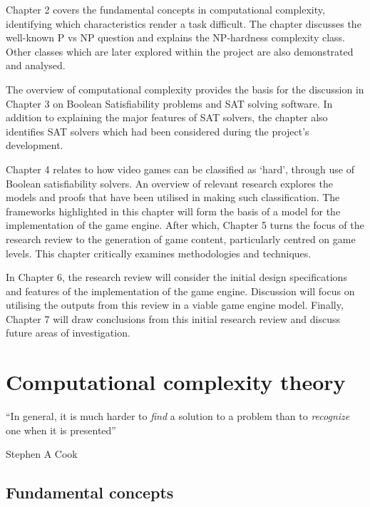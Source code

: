 \documentclass[11pt, a4paper, oneside]{report} %
\begin{document}
Chapter 2 covers the fundamental concepts in computational complexity,
identifying which characteristics render a task difficult. The chapter discusses
the well-known P vs NP question and explains the NP-hardness complexity class.
Other classes which are later explored within the project are also demonstrated
and analysed. 

The overview of computational complexity provides the basis for the discussion
in Chapter 3 on Boolean Satisfiability problems and SAT solving software. In
addition to explaining the major features of SAT solvers, the chapter also
identifies SAT solvers which had been considered during the project's
development.

Chapter 4 relates to how video games can be classified as `hard', through use of
Boolean satisfiability solvers. An overview of relevant research explores the
models and proofs that have been utilised in making such classification. The
frameworks highlighted in this chapter will form the basis of a model for the
implementation of the game engine. After which, Chapter 5 turns the focus of the
research review to the generation of game content, particularly centred on game
levels.  This chapter critically examines methodologies and techniques.

In Chapter 6, the research review will consider the initial design
specifications and features of the implementation of the game engine. Discussion
will focus on utilising the outputs from this review in a viable game engine
model. Finally, Chapter 7 will draw conclusions from this initial research
review and discuss future areas of investigation.


\chapter{Computational complexity theory}

\epigraph{``In general, it is much harder to \textit{find} a solution to a problem than to
\textit{recognize} one when it is presented''}{Stephen A Cook \cite{cook1984can}}

\section{Fundamental concepts}
\end{document}
